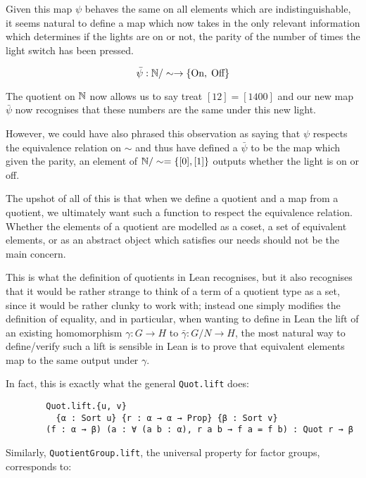 \begin{remark}
    Given this map $\psi$ behaves the same on all elements which are indistinguishable, it seems natural to 
    define a map which now takes in the only relevant information which determines if the lights are on or not,
    the parity of the number of times the light switch has been pressed.
    
    \[
    \bar{\psi} : \mathbb{N} / \sim \rightarrow \{\text{On}, \; \text{Off}\}
    \]

    The quotient on $\mathbb{N}$ now allows us to say treat $[12] = [1400]$ and our new map $\bar{\psi}$ now recognises that these numbers are the same
    under this new light. 

    However, we could have also phrased this observation as saying that $\psi$ respects the equivalence relation on $\sim$ and
    thus have defined a $\bar{\psi}$ to be the map which given the parity, an element of $\mathbb{N} / \sim = \{[0], [1]\}$ outputs whether the light is on or off. 

    The upshot of all of this is that when we define a quotient and a map from a quotient, we ultimately want such a function to respect the equivalence relation. Whether the elements of a quotient are
    modelled as a coset, a set of equivalent elements, or as an abstract object which satisfies our needs should not be the main concern. 

    This is what the definition of quotients in Lean recognises, but it also recognises that it would be rather strange to think of a term of a quotient type as a set, since it would be rather clunky to work with; 
    instead one simply modifies the definition of equality, and in particular, when wanting to define in Lean the lift of an existing homomorphism $\gamma : G \rightarrow H$
    to $\bar{\gamma} : G/N \rightarrow H$, the most natural way to define/verify such a lift is sensible in Lean is to prove that equivalent elements map to the same output under $\gamma$.

    In fact, this is exactly what the general \texttt{Quot.lift} does:

    \begin{footnotesize}
    \begin{verbatim}
        Quot.lift.{u, v} 
          {α : Sort u} {r : α → α → Prop} {β : Sort v} 
        (f : α → β) (a : ∀ (a b : α), r a b → f a = f b) : Quot r → β
    \end{verbatim}
    \end{footnotesize}

    Similarly, \texttt{QuotientGroup.lift}, the universal property for factor groups, corresponds to:


\end{remark}
